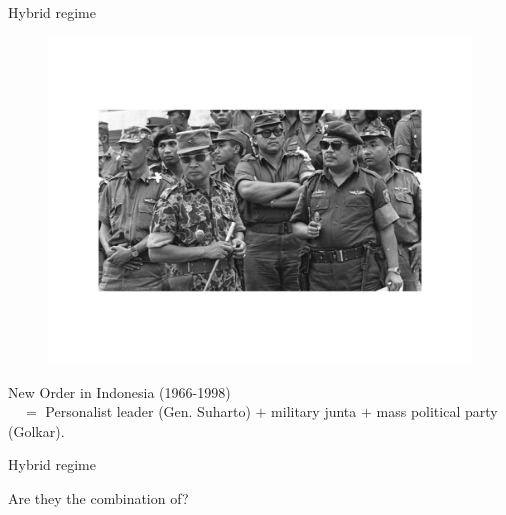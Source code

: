 \documentclass[10pt]{beamer}
\begin{document}
\begin{frame}{Hybrid regime}
	\begin{figure}
	\includegraphics[scale=0.35]{Figs/Countries/indonesia}
	\end{figure}
	\pause
	\small
	New Order in Indonesia (1966-1998) \\
	\pause $\quad =$ Personalist leader (Gen. Suharto) $+$ military junta $+$ mass political party (Golkar).
\end{frame}

\begin{frame}{Hybrid regime}
	\begin{figure}
	\centering
	\hspace{0.1cm}
	\end{figure}
	Are they the combination of?
\end{frame}
\end{document}
